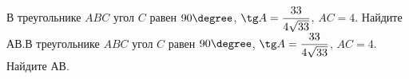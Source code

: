 \begin{ex}
	\begin{condition}
		В треугольнике \( ABC \) угол \( C \) равен \( 90 \degree \), \( \tg A=\dfrac{33}{4\sqrt{33}} \), \( AC=4 \). Найдите \( АВ \).В треугольнике \( ABC \) угол \( C \) равен \( 90 \degree \), \( \tg A=\dfrac{33}{4\sqrt{33}} \), \( AC=4 \). Найдите \( АВ \).
	\end{condition}
\end{ex}